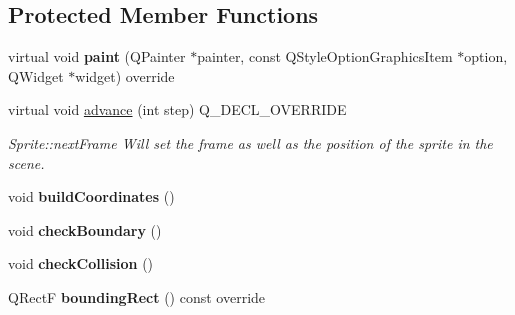 \subsection*{Protected Member Functions}
\begin{DoxyCompactItemize}
\item 
\mbox{\label{class_sprite_a73230a5034b8d9091a3e31fbdd3b0d46}} 
virtual void {\bfseries paint} (Q\+Painter $\ast$painter, const Q\+Style\+Option\+Graphics\+Item $\ast$option, Q\+Widget $\ast$widget) override
\item 
\mbox{\label{class_sprite_a48de16f5c8661ef4700ab7a411aebded}} 
virtual void \hyperlink{class_sprite_a48de16f5c8661ef4700ab7a411aebded}{advance} (int step) Q\+\_\+\+D\+E\+C\+L\+\_\+\+O\+V\+E\+R\+R\+I\+DE
\begin{DoxyCompactList}\small\item\em Sprite\+::next\+Frame Will set the frame as well as the position of the sprite in the scene. \end{DoxyCompactList}\item 
\mbox{\label{class_sprite_a0af8ed7bce1d1dde0a2c01f9461d4b4f}} 
void {\bfseries build\+Coordinates} ()
\item 
\mbox{\label{class_sprite_a4af173bffcc73a079c311118b9833780}} 
void {\bfseries check\+Boundary} ()
\item 
\mbox{\label{class_sprite_aaa1b06057132ee51960b783635cfec44}} 
void {\bfseries check\+Collision} ()
\item 
\mbox{\label{class_sprite_a642055fcd741b2c205a9a1359ce0b30f}} 
Q\+RectF {\bfseries bounding\+Rect} () const override
\end{DoxyCompactItemize}

